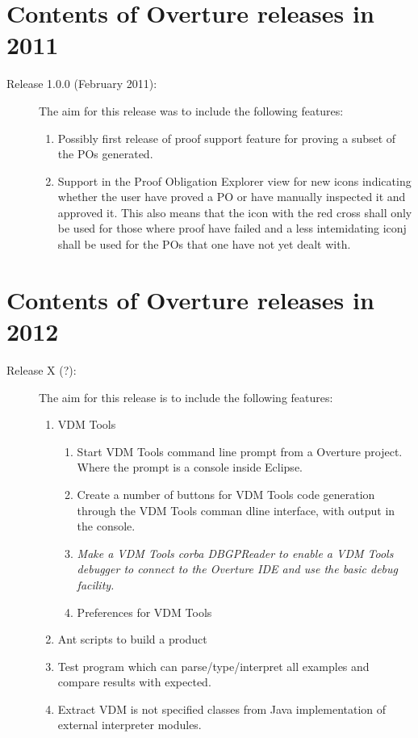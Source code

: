\documentclass{overturerep}
\newcommand{\markDone}[1]{{\color{Gray}#1}}
\newcommand{\markDeleted}[1]{{\color{Maroon}\textit{#1}}}
\newcommand{\developer}[1]{{\scriptsize \fbox{#1}}}
\begin{document}
\chapter{Contents of Overture releases in 2011}\label{sec:Overture2011}

\begin{description}
\item[Release 1.0.0 (February 2011):] The aim for this release was to
  include the following features:   
\begin{enumerate}
\item \markDone{Possibly first release of proof support feature for proving a
  subset of the POs generated. \developer{NickBattle}}
\item \markDone{Support in the Proof Obligation Explorer view for new icons
  indicating whether the user have proved a PO or have manually
  inspected it and approved it. This also means that the icon with the
  red cross shall only be used for those where proof have failed and a
  less intemidating iconj shall be used for the POs that one have not
  yet dealt with. \developer{??}}
\end{enumerate}
\end{description}

\chapter{Contents of Overture releases in 2012}\label{sec:Overture2012}


\begin{description}
\item[Release X (?):] The aim for this release is to
  include the following features:  
\begin{enumerate}
\item \markDone{ VDM Tools
	\begin{enumerate}
		\item Start VDM Tools command line prompt from a Overture project. Where the prompt is a console inside Eclipse.
		
		\item Create a number of buttons for VDM Tools code generation through the VDM Tools comman dline interface, with output in the console.
		
		\item \markDeleted{ Make a VDM Tools corba DBGPReader to enable a VDM Tools debugger to connect to the Overture IDE and use the basic debug facility.}
		\item Preferences for VDM Tools
	\end{enumerate}
      }




\item \markDone{Ant scripts to build a product}
\item \markDone{Test program which can parse/type/interpret all examples and compare results with expected.}
\item \markDone{Extract VDM is not specified classes from Java implementation of external interpreter modules.}

\end{enumerate}
\end{description}
\end{document}
